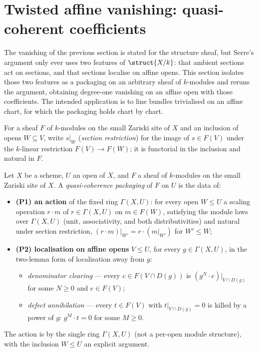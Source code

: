\section{Twisted affine vanishing: quasi-coherent coefficients}
\label{sec:qcoh_vanishing}

The vanishing of the previous section is stated for the structure sheaf, but Serre's argument
only ever uses two features of \(\struct{X/k}\): that ambient sections act on sections, and that
sections localise on affine opens. This section isolates those two features as a packaging on an
arbitrary sheaf of \(k\)-modules and reruns the argument, obtaining degree-one vanishing on an
affine open with those coefficients. The intended application is to line bundles trivialised on
an affine chart, for which the packaging holds chart by chart.

For a sheaf \(F\) of \(k\)-modules on the small Zariski site of \(X\) and an inclusion of opens
\(W \subseteq V\), write \(s|_W\) (\emph{section restriction}) for the image of \(s \in F(V)\)
under the \(k\)-linear restriction \(F(V) \to F(W)\); it is functorial in the inclusion and
natural in \(F\).

\begin{definition}
  \label{def:qcohOn}
  \leanok
  Let \(X\) be a scheme, \(U\) an open of \(X\), and \(F\) a sheaf of \(k\)-modules on the small
  Zariski site of \(X\). A \emph{quasi-coherence packaging} of \(F\) on \(U\) is the data of:
  \begin{itemize}
    \item \textbf{(P1) an action} of the fixed ring \(\Gamma(X, U)\): for every open \(W \le U\)
      a scaling operation \(r \cdot m\) of \(r \in \Gamma(X, U)\) on \(m \in F(W)\), satisfying
      the module laws over \(\Gamma(X, U)\) (unit, associativity, and both distributivities) and
      natural under section restriction, \((r \cdot m)|_{W'} = r \cdot (m|_{W'})\) for \(W' \le
      W\);
    \item \textbf{(P2) localisation on affine opens} \(V \le U\), for every \(g \in \Gamma(X,
      U)\), in the two-lemma form of localisation away from \(g\):
      \begin{itemize}
        \item \emph{denominator clearing} — every \(c \in F(V \cap D(g))\) is \((g^N \cdot
          e)|_{V \cap D(g)}\) for some \(N \ge 0\) and \(e \in F(V)\);
        \item \emph{defect annihilation} — every \(t \in F(V)\) with \(t|_{V \cap D(g)} = 0\) is
          killed by a power of \(g\): \(g^M \cdot t = 0\) for some \(M \ge 0\).
      \end{itemize}
  \end{itemize}
  The action is by the single ring \(\Gamma(X, U)\) (not a per-open module structure), with the
  inclusion \(W \le U\) an explicit argument.
\end{definition}

